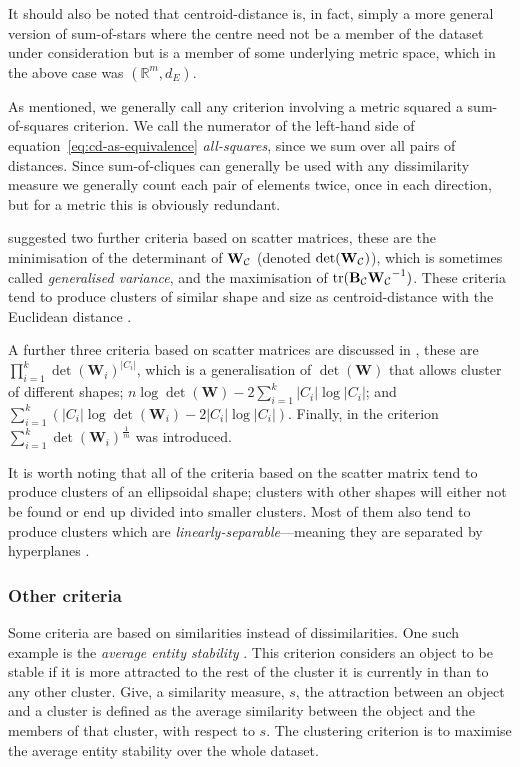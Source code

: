 It should also be noted that centroid-distance is, in fact, simply a more
general version of sum-of-stars where the centre need not be a member of the
dataset under consideration but is a member of some underlying metric space,
which in the above case was $(\mathbb{R}^m,d_E)$.

As mentioned, we generally call any criterion involving a metric squared a
sum-of-squares criterion.  We call the numerator of the left-hand side of
equation~\eqref{eq:cd-as-equivalence} \textit{all-squares}, since we sum over
all pairs of distances.  Since sum-of-cliques can generally be used with any
dissimilarity measure we generally count each pair of elements twice, once in
each direction, but for a metric this is obviously redundant.

\citet{friedman1967criteria} suggested two further criteria based on scatter
matrices, these are the minimisation of the determinant of
$\mathbf{W_{\mathcal{C}}}$ (denoted $\det(\mathbf{W}_{\mathcal{C}})$), which is sometimes
called \textit{generalised variance}, and the maximisation of
$\operatorname*{tr}(\mathbf{B_{\mathcal{C}}W_{\mathcal{C}}}^{-1})$.  These criteria tend to produce
clusters of similar shape and size as centroid-distance with the Euclidean
distance \citep{marriott1982optimization}.

A further three criteria based on scatter matrices are discussed in
\citep{marriott1982optimization}, these are
$\prod_{i=1}^{k}\det(\mathbf{W}_i)^{|C_i|}$, which is a generalisation of
$\det(\mathbf{W})$ that allows cluster of different shapes; $n
\log{\det(\mathbf{W})} - 2\sum_{i=1}^{k} |C_i| \log{|C_i|}$; and
$\sum_{i=1}^{k} (|C_i| \log{\det(\mathbf{W}_i)} - 2|C_i|\log{|C_i|})$.
Finally, in \citep{maronna1974} the criterion
$\sum_{i=1}^{k}\det(\mathbf{W}_i)^{\frac{1}{m}}$ was introduced.

It is worth noting that all of the criteria based on the scatter matrix tend
to produce clusters of an ellipsoidal shape; clusters with other shapes will
either not be found or end up divided into smaller clusters.  Most of them
also tend to produce clusters which are \textit{linearly-separable}---meaning
they are separated by hyperplanes \citep{marriott1982optimization}.

\subsubsection{Other criteria}
\label{sec:other-criteria}

Some criteria are based on similarities instead of dissimilarities.  One such
example is the \textit{average entity stability} \citep{Rubin67optimal}.  This
criterion considers an object to be stable if it is more attracted to the rest
of the cluster it is currently in than to any other cluster.  Give, a
similarity measure, $s$, the attraction between an object and a cluster is
defined as the average similarity between the object and the members of that
cluster, with respect to $s$.  The clustering criterion is to maximise the
average entity stability over the whole dataset.

